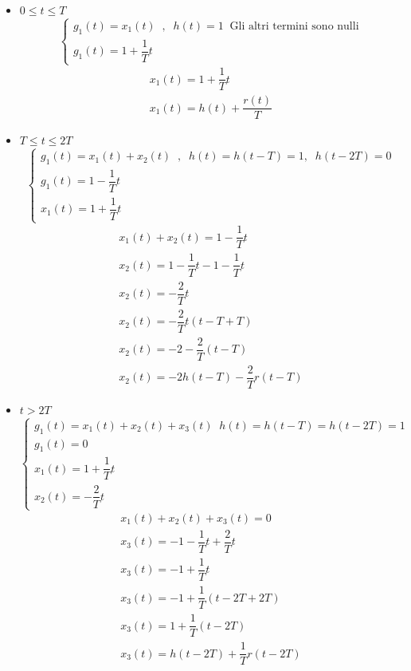 \documentclass[a4paper]{report}
\begin{document}
\begin{itemize}
\item $0 \leq t \leq T$
  \[
  \left\{
  \begin{array}{l}
    g_1(t) = x_1(t) \;\;,\;\;h(t) = 1 \;\;\textrm{Gli altri termini sono
      nulli}\\
    g_1(t) = 1 + \dfrac{1}{T}t
  \end{array}
  \right.
  \]
  \[
  \begin{array}{l}
    x_1(t) = 1 + \dfrac{1}{T}t\\
    x_1(t) = h(t) + \dfrac{r(t)}{T}
  \end{array}
  \]

\item $T \leq t \leq 2T$
  \[
   \left\{
   \begin{array}{l}
     g_1(t) = x_1(t) + x_2(t)  \;\;,\;\;h(t) = h(t - T) = 1, \;\;h(t -
     2T) = 0\\
     g_1(t) = 1 - \dfrac{1}{T}t\\
     x_1(t) = 1 + \dfrac{1}{T}t
   \end{array}
   \right.
   \]
   \[
   \begin{array}{l}
     x_1(t) + x_2(t) = 1 - \dfrac{1}{T}t\\
     x_2(t) = 1 - \dfrac{1}{T}t - 1 - \dfrac{1}{T}t\\
     x_2(t) = -\dfrac{2}{T}t\\
     x_2(t) =  -\dfrac{2}{T}t(t - T + T)\\
     x_2(t) = -2 - \dfrac{2}{T}(t - T)\\
     x_2(t) = -2h(t - T) - \dfrac{2}{T}r(t - T)
   \end{array}
   \]
 \item $t > 2T$
   \[
   \left\{
   \begin{array}{l}
     g_1(t) = x_1(t) + x_2(t) + x_3(t) \;\;h(t) = h(t - T) = h(t - 2T)
     = 1\\
     g_1(t) = 0\\
     x_1(t) = 1 + \dfrac{1}{T}t\\
     x_2(t) = - \dfrac{2}{T}t
   \end{array}
   \right.
   \]
   \[
   \begin{array}{l}
     x_1(t) + x_2(t) + x_3(t) = 0\\
     x_3(t) = - 1 - \dfrac{1}{T}t + \dfrac{2}{T}t\\
     x_3(t) = - 1 + \dfrac{1}{T}t\\
     x_3(t) =  - 1 + \dfrac{1}{T}(t - 2T + 2T)\\
     x_3(t) = 1 + \dfrac{1}{T}(t - 2T)\\
     x_3(t) = h(t - 2T) + \dfrac{1}{T}r(t - 2T)
   \end{array}
   \]
\end{itemize}
\end{document}

